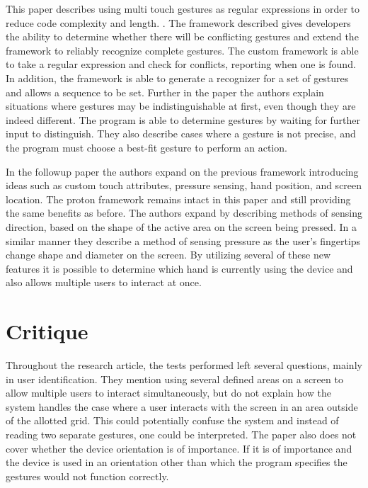\documentclass[11pt]{article}
\begin{document}
This paper describes using multi touch gestures as regular expressions in order to reduce code complexity and length. \cite{Kin:2012:PMG:2208636.2208694}. The framework described gives developers the ability to determine whether there will be conflicting gestures and extend the framework to reliably recognize complete gestures. The custom framework is able to take a regular expression and check for conflicts, reporting when one is found. In addition, the framework is able to generate a recognizer for a set of gestures and allows a sequence to be set. Further in the paper the authors explain situations where gestures may be indistinguishable at first, even though they are indeed different. The program is able to determine gestures by waiting for further input to distinguish. They also describe cases where a gesture is not precise, and the program must choose a best-fit gesture to perform an action.

In the followup paper the authors expand on the previous framework introducing ideas such as custom touch attributes, pressure sensing, hand position, and screen location. \cite{Kin:2012:PCD:2380116.2380176} The proton framework remains intact in this paper and still providing the same benefits as before. The authors expand by describing methods of sensing direction, based on the shape of the active area on the screen being pressed. In a similar manner they describe a method of sensing pressure as the user's fingertips change shape and diameter on the screen. By utilizing several of these new features it is possible to determine which hand is currently using the device and also allows multiple users to interact at once.


\vspace*{-.1in}
\section{Critique}
\label{sec:critique}
\vspace*{-.1in}

Throughout the research article, the tests performed left several questions, mainly in user identification. They mention using several defined areas on a screen to allow multiple users to interact simultaneously, but do not explain how the system handles the case where a user interacts with the screen in an area outside of the allotted grid. This could potentially confuse the system and instead of reading two separate gestures, one could be interpreted. The paper also does not cover whether the device orientation is of importance. If it is of importance and the device is used in an orientation other than which the program specifies the gestures would not function correctly.
\end{document}

